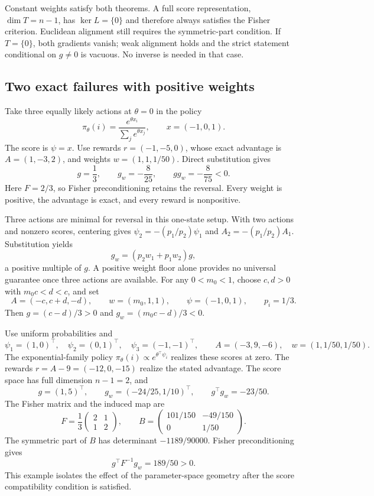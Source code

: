 Constant weights satisfy both theorems. A full score representation, $\dim T=n-1$, has $\ker L=\{0\}$ and therefore always satisfies the Fisher criterion. Euclidean alignment still requires the symmetric-part condition. If $T=\{0\}$, both gradients vanish; weak alignment holds and the strict statement conditional on $g\ne0$ is vacuous. No inverse is needed in that case.

\subsection{Two exact failures with positive weights}

\begin{example}
\label{ex:scalar-weight}
Take three equally likely actions at $\theta=0$ in the policy
\[
\pi_\theta(i)=\frac{e^{\theta x_i}}{\sum_j e^{\theta x_j}},\qquad x=(-1,0,1).
\]
The score is $\psi=x$. Use rewards $r=(-1,-5,0)$, whose exact advantage is $A=(1,-3,2)$, and weights $w=(1,1,1/50)$. Direct substitution gives
\[
g=\frac13,\qquad g_w=-\frac8{25},\qquad gg_w=-\frac8{75}<0.
\]
Here $F=2/3$, so Fisher preconditioning retains the reversal. Every weight is positive, the advantage is exact, and every reward is nonpositive.
\end{example}

Three actions are minimal for reversal in this one-state setup. With two actions and nonzero scores, centering gives $\psi_2=-(p_1/p_2)\psi_1$ and $A_2=-(p_1/p_2)A_1$. Substitution yields
\[
g_w=(p_2w_1+p_1w_2)g,
\]
a positive multiple of $g$. A positive weight floor alone provides no universal guarantee once three actions are available. For any $0<m_0<1$, choose $c,d>0$ with $m_0c<d<c$, and set
\[
A=(-c,c+d,-d),\qquad w=(m_0,1,1),\qquad \psi=(-1,0,1),\qquad p_i=1/3.
\]
Then $g=(c-d)/3>0$ and $g_w=(m_0c-d)/3<0$.

\begin{example}
\label{ex:full-weight}
Use uniform probabilities and
\[
\psi_1=(1,0)^\top,\quad \psi_2=(0,1)^\top,\quad \psi_3=(-1,-1)^\top,
\qquad A=(-3,9,-6),\quad w=(1,1/50,1/50).
\]
The exponential-family policy $\pi_\theta(i)\propto e^{\theta^\top\psi_i}$ realizes these scores at zero. The rewards $r=A-9=(-12,0,-15)$ realize the stated advantage. The score space has full dimension $n-1=2$, and
\[
g=(1,5)^\top,\qquad g_w=(-24/25,1/10)^\top,\qquad g^\top g_w=-23/50.
\]
The Fisher matrix and the induced map are
\[
F=\frac13\begin{pmatrix}2&1\\1&2\end{pmatrix},\qquad
B=\begin{pmatrix}101/150&-49/150\\0&1/50\end{pmatrix}.
\]
The symmetric part of $B$ has determinant $-1189/90000$. Fisher preconditioning gives
\[
g^\top F^{-1}g_w=189/50>0.
\]
This example isolates the effect of the parameter-space geometry after the score compatibility condition is satisfied.
\end{example}

